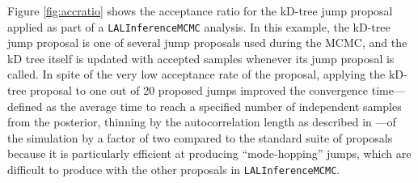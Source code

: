 \documentclass{rsos}
\begin{document}
Figure \ref{fig:accratio} shows the acceptance ratio for the kD-tree
jump proposal applied as part of a \texttt{LALInferenceMCMC} analysis.
In this example, the kD-tree jump proposal is one of several jump
proposals used during the MCMC, and the kD tree itself is updated with
accepted samples whenever its jump proposal is called. In spite of the
very low acceptance rate of the proposal, applying the kD-tree
proposal to one out of 20 proposed jumps improved the convergence
time---defined as the average time to reach a specified number of
independent samples from the posterior, thinning by the
autocorrelation length as described in \cite{Veitch:2014}---of the
simulation by a factor of two compared to the standard suite of
proposals because it is particularly efficient at producing
``mode-hopping'' jumps, which are difficult to produce with the other
proposals in \texttt{LALInferenceMCMC}.
\end{document}
